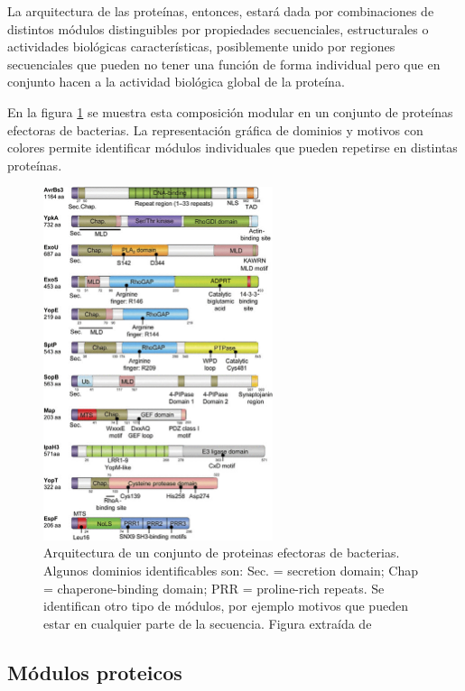 La arquitectura de las proteínas, entonces, estará dada por combinaciones de distintos módulos distinguibles por propiedades secuenciales, estructurales o actividades biológicas características, 
posiblemente unido por regiones secuenciales que pueden no tener una función de forma individual pero que en conjunto hacen a la actividad biológica global de la proteína.

En la figura \ref{arquitectura} se muestra esta composición modular en un conjunto de proteínas efectoras de bacterias.
La representación gráfica de dominios y motivos con colores permite identificar módulos individuales que pueden repetirse en distintas proteínas.

\begin{figure}[htbp,centered]
\centering
\includegraphics[width=0.6\textwidth]{img/architecture.jpg} 
\caption{Arquitectura de un conjunto de proteinas efectoras de bacterias. Algunos dominios identificables son: Sec. = secretion domain; Chap = chaperone-binding domain; PRR = proline-rich repeats. 
Se identifican otro tipo de módulos, por ejemplo motivos que pueden estar en cualquier parte de la secuencia. Figura extraída de \cite{dean2011functional}} 
\label{arquitectura}
\end{figure}


\subsection{Módulos proteicos}
